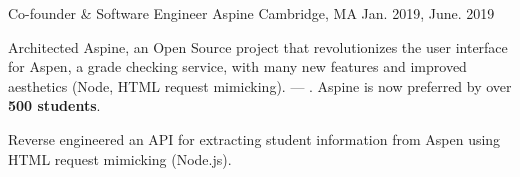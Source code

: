 \begin{cventries}
  \cventry
    {Co-founder \& Software Engineer} %
    {Aspine} %
    {Cambridge, MA} %
    {Jan. 2019, June. 2019} %
    {
      \begin{cvitems} %
      \item {Architected Aspine, an Open Source project that revolutionizes the user interface for Aspen, a grade checking service, with many new features and improved aesthetics (Node, HTML request mimicking).  --- . Aspine is now preferred by over \textbf{500 students}.}
      \item {Reverse engineered an API for extracting student information from Aspen using HTML request mimicking (Node.js).}
      \end{cvitems}
    }

\end{cventries}
